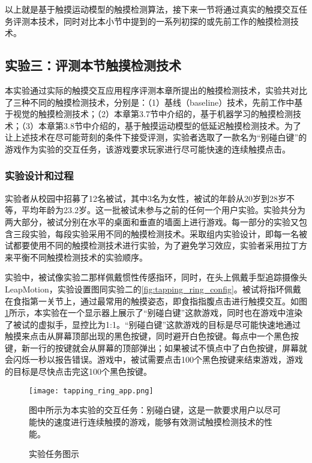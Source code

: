 以上就是基于触摸运动模型的触摸检测算法，接下来一节将通过真实的触摸交互任务评测本技术，同时对比本小节中提到的一系列初探的或先前工作的触摸检测技术。

\subsection{实验三：评测本节触摸检测技术}

本实验通过实际的触摸交互应用程序评测本章所提出的触摸检测技术，实验共对比了三种不同的触摸检测技术，分别是：（1）基线（baseline）技术，先前工作中基于视觉的触摸检测技术\cite{xiao2018mrtouch}；（2）本章第3.7节中介绍的，基于机器学习的触摸检测技术；（3）本章第3.8节中介绍的，基于触摸运动模型的低延迟触摸检测技术。为了让上述技术在尽可能苛刻的条件下接受评测，实验者选取了一款名为“别碰白键”的游戏作为实验的交互任务，该游戏要求玩家进行尽可能快速的连续触摸点击。

\subsubsection{实验设计和过程}

实验者从校园中招募了12名被试，其中3名为女性，被试的年龄从20岁到28岁不等，平均年龄为23.2岁。这一批被试未参与之前的任何一个用户实验。实验共分为两大部分，被试分别在水平的桌面和垂直的墙面上进行游戏。每一部分的实验又包含三段实验，每段实验采用不同的触摸检测技术。采取组内实验设计，即每一名被试都要使用不同的触摸检测技术进行实验，为了避免学习效应，实验者采用拉丁方来平衡不同触摸检测技术的实验顺序。

实验中，被试像实验二那样佩戴惯性传感指环，同时，在头上佩戴手型追踪摄像头LeapMotion，实验设置图同实验二的\ref{fig:tapping_ring_config}。被试将指环佩戴在食指第一关节上，通过最常用的触摸姿态，即食指指腹点击进行触摸交互。如图\ref{fig:tapping_ring_app}所示，本实验在一个显示器上展示了“别碰白键”这款游戏，同时也在游戏中渲染了被试的虚拟手，显控比为1:1。“别碰白键”这款游戏的目标是尽可能快速地通过触摸来点击从屏幕顶部出现的黑色按键，同时避开白色按键。每点中一个黑色按键，新一行的按键就会从屏幕的顶部弹出；如果被试不慎点中了白色按键，屏幕就会闪烁一秒以报告错误。游戏中，被试需要点击100个黑色按键来结束游戏，游戏的目标是尽快点击完这100个黑色按键。

\begin{figure}
	\centering
	\texttt{[image: tapping\_ring\_app.png]}
	\caption*{图中所示为本实验的交互任务：别碰白键，这是一款要求用户以尽可能快的速度进行连续触摸的游戏，能够有效测试触摸检测技术的性能。}
	\caption{实验任务图示}
	\label{fig:tapping_ring_app}
\end{figure}

